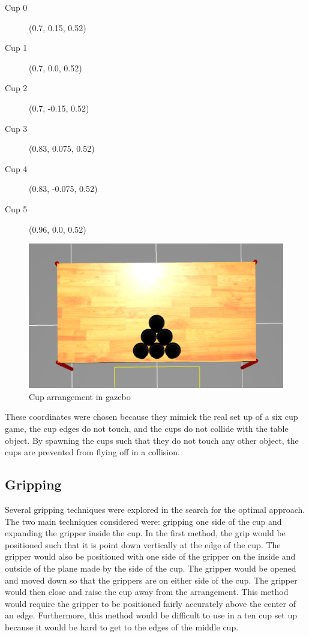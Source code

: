 \documentclass[letterpaper, 10 pt, conference]{ieeeconf}  %
\begin{document}
\begin{description}
\item[Cup 0]  (0.7, 0.15, 0.52)
\item[Cup 1] (0.7, 0.0, 0.52)
\item[Cup 2] (0.7, -0.15, 0.52)
\item[Cup 3] (0.83, 0.075, 0.52)
\item[Cup 4] (0.83, -0.075, 0.52)
\item[Cup 5] (0.96, 0.0, 0.52)
\end{description}

\begin{figure}[thpb]
      \centering
	  \includegraphics[scale =0.3]{cups}
      \caption{Cup arrangement in gazebo}
      \label{fig:cups}
\end{figure}

These coordinates were chosen because they mimick the real set up of a six cup game, the cup edges do not touch, and the cups do not collide with the table object. By spawning the cups such that they do not touch any other object, the cups are prevented from flying off in a collision.

\subsection{Gripping}
Several gripping techniques were explored in the search for the optimal approach. The two main techniques considered were: gripping one side of the cup and expanding the gripper inside the cup. In the first method, the grip would be positioned such that it is point down vertically at the edge of the cup. The gripper would also be positioned with one side of the gripper on the inside and outside of the plane made by the side of the cup. The gripper would be opened and moved down so that the grippers are on either side of the cup. The gripper would then close and raise the cup away from the arrangement. This method would require the gripper to be positioned fairly accurately above the center of an edge. Furthermore, this method would be difficult to use in a ten cup set up because it would be hard to get to the edges of the middle cup. 
\end{document}
